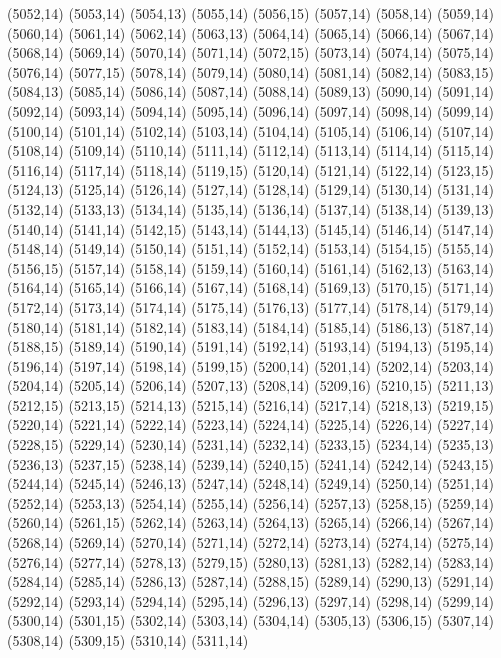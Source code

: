 (5052,14)
(5053,14)
(5054,13)
(5055,14)
(5056,15)
(5057,14)
(5058,14)
(5059,14)
(5060,14)
(5061,14)
(5062,14)
(5063,13)
(5064,14)
(5065,14)
(5066,14)
(5067,14)
(5068,14)
(5069,14)
(5070,14)
(5071,14)
(5072,15)
(5073,14)
(5074,14)
(5075,14)
(5076,14)
(5077,15)
(5078,14)
(5079,14)
(5080,14)
(5081,14)
(5082,14)
(5083,15)
(5084,13)
(5085,14)
(5086,14)
(5087,14)
(5088,14)
(5089,13)
(5090,14)
(5091,14)
(5092,14)
(5093,14)
(5094,14)
(5095,14)
(5096,14)
(5097,14)
(5098,14)
(5099,14)
(5100,14)
(5101,14)
(5102,14)
(5103,14)
(5104,14)
(5105,14)
(5106,14)
(5107,14)
(5108,14)
(5109,14)
(5110,14)
(5111,14)
(5112,14)
(5113,14)
(5114,14)
(5115,14)
(5116,14)
(5117,14)
(5118,14)
(5119,15)
(5120,14)
(5121,14)
(5122,14)
(5123,15)
(5124,13)
(5125,14)
(5126,14)
(5127,14)
(5128,14)
(5129,14)
(5130,14)
(5131,14)
(5132,14)
(5133,13)
(5134,14)
(5135,14)
(5136,14)
(5137,14)
(5138,14)
(5139,13)
(5140,14)
(5141,14)
(5142,15)
(5143,14)
(5144,13)
(5145,14)
(5146,14)
(5147,14)
(5148,14)
(5149,14)
(5150,14)
(5151,14)
(5152,14)
(5153,14)
(5154,15)
(5155,14)
(5156,15)
(5157,14)
(5158,14)
(5159,14)
(5160,14)
(5161,14)
(5162,13)
(5163,14)
(5164,14)
(5165,14)
(5166,14)
(5167,14)
(5168,14)
(5169,13)
(5170,15)
(5171,14)
(5172,14)
(5173,14)
(5174,14)
(5175,14)
(5176,13)
(5177,14)
(5178,14)
(5179,14)
(5180,14)
(5181,14)
(5182,14)
(5183,14)
(5184,14)
(5185,14)
(5186,13)
(5187,14)
(5188,15)
(5189,14)
(5190,14)
(5191,14)
(5192,14)
(5193,14)
(5194,13)
(5195,14)
(5196,14)
(5197,14)
(5198,14)
(5199,15)
(5200,14)
(5201,14)
(5202,14)
(5203,14)
(5204,14)
(5205,14)
(5206,14)
(5207,13)
(5208,14)
(5209,16)
(5210,15)
(5211,13)
(5212,15)
(5213,15)
(5214,13)
(5215,14)
(5216,14)
(5217,14)
(5218,13)
(5219,15)
(5220,14)
(5221,14)
(5222,14)
(5223,14)
(5224,14)
(5225,14)
(5226,14)
(5227,14)
(5228,15)
(5229,14)
(5230,14)
(5231,14)
(5232,14)
(5233,15)
(5234,14)
(5235,13)
(5236,13)
(5237,15)
(5238,14)
(5239,14)
(5240,15)
(5241,14)
(5242,14)
(5243,15)
(5244,14)
(5245,14)
(5246,13)
(5247,14)
(5248,14)
(5249,14)
(5250,14)
(5251,14)
(5252,14)
(5253,13)
(5254,14)
(5255,14)
(5256,14)
(5257,13)
(5258,15)
(5259,14)
(5260,14)
(5261,15)
(5262,14)
(5263,14)
(5264,13)
(5265,14)
(5266,14)
(5267,14)
(5268,14)
(5269,14)
(5270,14)
(5271,14)
(5272,14)
(5273,14)
(5274,14)
(5275,14)
(5276,14)
(5277,14)
(5278,13)
(5279,15)
(5280,13)
(5281,13)
(5282,14)
(5283,14)
(5284,14)
(5285,14)
(5286,13)
(5287,14)
(5288,15)
(5289,14)
(5290,13)
(5291,14)
(5292,14)
(5293,14)
(5294,14)
(5295,14)
(5296,13)
(5297,14)
(5298,14)
(5299,14)
(5300,14)
(5301,15)
(5302,14)
(5303,14)
(5304,14)
(5305,13)
(5306,15)
(5307,14)
(5308,14)
(5309,15)
(5310,14)
(5311,14)
